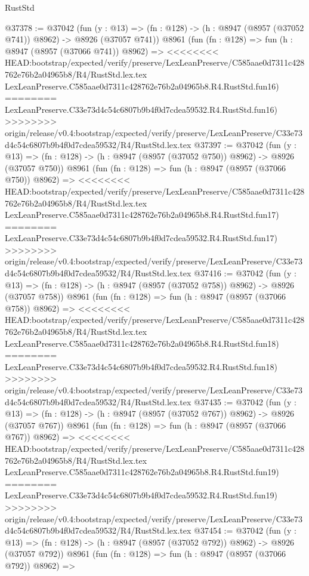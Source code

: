 \begin{lexlean}{RustStd}
\begin{coremodule}
{\begin{coremodule}
{{{{{{{{{{{{{{{{{{{{{{{{{{{{{{{{{{{{{{{@37378 := @37042
    (fun (y : @13) => (fn : @128) -> (h : @8947 (@8957 (@37052 @741)) @8962) -> @8926 (@37057 @741))
    @8961
    (fun (fn : @128) =>
    fun (h : @8947 (@8957 (@37066 @741)) @8962) =>
<<<<<<<< HEAD:bootstrap/expected/verify/preserve/LexLeanPreserve/C585aae0d7311c428762e76b2a04965b8/R4/RustStd.lex.tex
    LexLeanPreserve.C585aae0d7311c428762e76b2a04965b8.R4.RustStd.fun16)
========
    LexLeanPreserve.C33e73d4c54c6807b9b4f0d7cdea59532.R4.RustStd.fun16)
>>>>>>>> origin/release/v0.4:bootstrap/expected/verify/preserve/LexLeanPreserve/C33e73d4c54c6807b9b4f0d7cdea59532/R4/RustStd.lex.tex
@37397 := @37042
    (fun (y : @13) => (fn : @128) -> (h : @8947 (@8957 (@37052 @750)) @8962) -> @8926 (@37057 @750))
    @8961
    (fun (fn : @128) =>
    fun (h : @8947 (@8957 (@37066 @750)) @8962) =>
<<<<<<<< HEAD:bootstrap/expected/verify/preserve/LexLeanPreserve/C585aae0d7311c428762e76b2a04965b8/R4/RustStd.lex.tex
    LexLeanPreserve.C585aae0d7311c428762e76b2a04965b8.R4.RustStd.fun17)
========
    LexLeanPreserve.C33e73d4c54c6807b9b4f0d7cdea59532.R4.RustStd.fun17)
>>>>>>>> origin/release/v0.4:bootstrap/expected/verify/preserve/LexLeanPreserve/C33e73d4c54c6807b9b4f0d7cdea59532/R4/RustStd.lex.tex
@37416 := @37042
    (fun (y : @13) => (fn : @128) -> (h : @8947 (@8957 (@37052 @758)) @8962) -> @8926 (@37057 @758))
    @8961
    (fun (fn : @128) =>
    fun (h : @8947 (@8957 (@37066 @758)) @8962) =>
<<<<<<<< HEAD:bootstrap/expected/verify/preserve/LexLeanPreserve/C585aae0d7311c428762e76b2a04965b8/R4/RustStd.lex.tex
    LexLeanPreserve.C585aae0d7311c428762e76b2a04965b8.R4.RustStd.fun18)
========
    LexLeanPreserve.C33e73d4c54c6807b9b4f0d7cdea59532.R4.RustStd.fun18)
>>>>>>>> origin/release/v0.4:bootstrap/expected/verify/preserve/LexLeanPreserve/C33e73d4c54c6807b9b4f0d7cdea59532/R4/RustStd.lex.tex
@37435 := @37042
    (fun (y : @13) => (fn : @128) -> (h : @8947 (@8957 (@37052 @767)) @8962) -> @8926 (@37057 @767))
    @8961
    (fun (fn : @128) =>
    fun (h : @8947 (@8957 (@37066 @767)) @8962) =>
<<<<<<<< HEAD:bootstrap/expected/verify/preserve/LexLeanPreserve/C585aae0d7311c428762e76b2a04965b8/R4/RustStd.lex.tex
    LexLeanPreserve.C585aae0d7311c428762e76b2a04965b8.R4.RustStd.fun19)
========
    LexLeanPreserve.C33e73d4c54c6807b9b4f0d7cdea59532.R4.RustStd.fun19)
>>>>>>>> origin/release/v0.4:bootstrap/expected/verify/preserve/LexLeanPreserve/C33e73d4c54c6807b9b4f0d7cdea59532/R4/RustStd.lex.tex
@37454 := @37042
    (fun (y : @13) => (fn : @128) -> (h : @8947 (@8957 (@37052 @792)) @8962) -> @8926 (@37057 @792))
    @8961
    (fun (fn : @128) =>
    fun (h : @8947 (@8957 (@37066 @792)) @8962) =>
}}}}}}}}}}}}}}}}}}}}}}}}}}}}}}}}}}}}}}}
\end{coremodule}}
\end{coremodule}
\end{lexlean}

